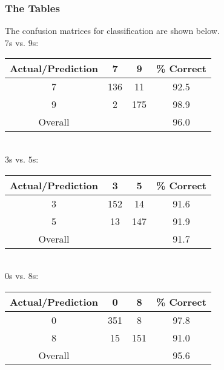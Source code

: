 \documentclass{article}
\begin{document}
\subsubsection{The Tables}
The confusion matrices for classification are shown below.\\
\newline
$7$s vs. $9$s:\\
\newline
\begin{tabular}{| c || c | c || c |}
  \hline
  Actual/Prediction &   7 &   9 &\% Correct \\
  \hline
  \hline
  7                 & 136 &  11 & 92.5 \\
  \hline
  9                 &   2 & 175 & 98.9 \\
  \hline
  \hline
  Overall           &     &     & 96.0 \\
  \hline
\end{tabular}\\
\newline
\newline
$3$s vs. $5$s:\\
\newline
\begin{tabular}{| c || c | c || c |}
  \hline
  Actual/Prediction &   3 &   5 &\% Correct \\
  \hline
  \hline
  3                 & 152 &  14 & 91.6 \\
  \hline
  5                 &  13 & 147 & 91.9 \\
  \hline
  \hline
  Overall           &     &     & 91.7 \\
  \hline
\end{tabular}\\
\newline
\newline
$0$s vs. $8$s:\\
\newline
\begin{tabular}{| c || c | c || c |}
  \hline
  Actual/Prediction &   0 &   8 &\% Correct \\
  \hline
  \hline
  0                 & 351 &   8 & 97.8 \\
  \hline
  8                 &  15 & 151 & 91.0 \\
  \hline
  \hline
  Overall           &     &     & 95.6 \\
  \hline
\end{tabular}\\
\newline
%
\end{document}
